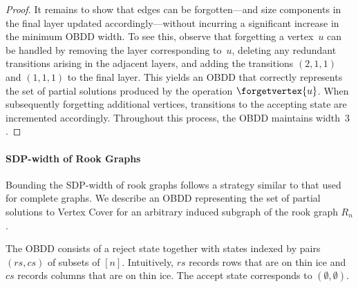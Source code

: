 \begin{proof}
It remains to show that edges can be forgotten—and size components in the final
layer updated accordingly—without incurring a significant increase in the
minimum OBDD width. To see this, observe that forgetting a vertex~$u$ can be
handled by removing the layer corresponding to~$u$, deleting any redundant
transitions arising in the adjacent layers, and adding the transitions
$(2,1,1)$ and $(1,1,1)$ to the final layer. This yields an OBDD that correctly
represents the set of partial solutions produced by the operation
$\forgetvertex{u}$. When subsequently forgetting additional vertices, transitions
to the accepting state are incremented accordingly. Throughout this process, the
OBDD maintains width~$3$.

  

\end{proof}

\paragraph*{SDP-width of Rook Graphs}

Bounding the SDP-width of rook graphs follows a strategy similar to that used
for complete graphs. We describe an OBDD representing the set of partial
solutions to {\sc Vertex Cover} for an arbitrary induced subgraph of the rook
graph $R_n$.

The OBDD consists of a reject state together with states indexed by pairs
$(rs,cs)$ of subsets of $[n]$. Intuitively, $rs$ records rows that are on thin
ice and $cs$ records columns that are on thin ice. The accept state corresponds
to $(\emptyset,\emptyset)$.

